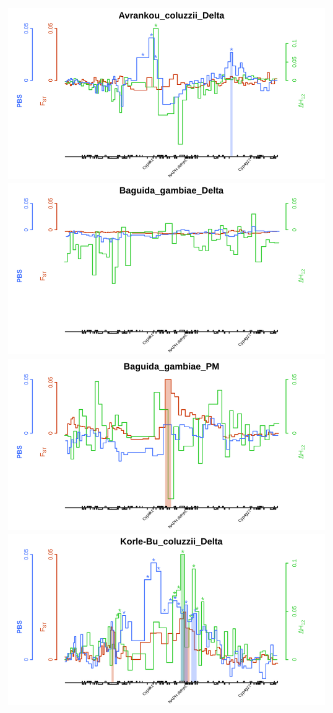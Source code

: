 \documentclass[a4paper,12pt]{article}
\begin{document}
\clearpage

\begin{figure}[h]
	\hspace{-0.3cm}\includegraphics*[width = 8.4cm]{../supplementary_cyp9k1_composite/Avrankou_coluzzii_Delta_composite_plot.png}
	\vskip 0.4cm
	\hspace{-0.3cm}\includegraphics*[width = 8.4cm]{../supplementary_cyp9k1_composite/Baguida_gambiae_Delta_composite_plot.png}
	\hspace{-0.3cm}\includegraphics*[width = 8.4cm]{../supplementary_cyp9k1_composite/Baguida_gambiae_PM_composite_plot.png}
	\vskip 0.4cm
	\hspace{-0.3cm}\includegraphics*[width = 8.4cm]{../supplementary_cyp9k1_composite/Korle-Bu_coluzzii_Delta_composite_plot.png}

\end{figure}
\end{document}
